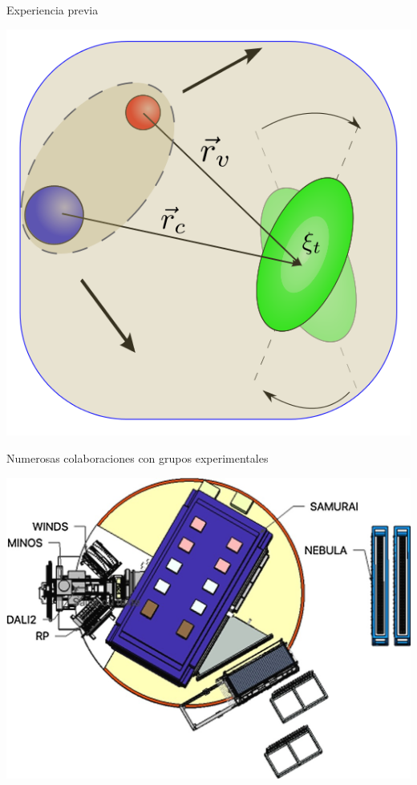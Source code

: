 \documentclass{beamer}
\begin{document}
\begin{frame}{Experiencia previa}
\begin{minipage}{0.45\textwidth}
    \includegraphics[height=0.3\textheight, width=\textwidth, keepaspectratio]{TExc.png}
    \end{minipage}
    \begin{minipage}{0.45\textwidth}
     \tiny Numerosas colaboraciones con grupos experimentales  
    
    \includegraphics[height=0.3\textheight]{samurai.jpg}
    \end{minipage}
    
\end{frame}
\end{document}

